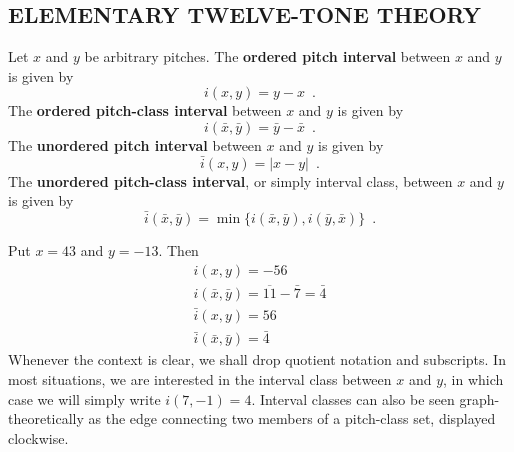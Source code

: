 
\chapter{}

\section{ELEMENTARY TWELVE-TONE THEORY}

\begin{definition}
	Let $x$ and $y$ be arbitrary pitches. The \textbf{ordered pitch interval} between
	$x$ and $y$ is given by
	\begin{equation}
		i(x, y) = y - x \enspace.
	\end{equation}
	The \textbf{ordered pitch-class interval} between $x$ and $y$ is given by
	\begin{equation}
		i(\bar{x}, \bar{y}) = \bar{y} - \bar{x} \enspace.
	\end{equation}
	The \textbf{unordered pitch interval} between $x$ and $y$ is given by
	\begin{equation}
		\bar{i}(x, y) = |x - y| \enspace.
	\end{equation}
	The \textbf{unordered pitch-class interval}, or simply interval class, between
	$x$ and $y$ is given by
	\begin{equation}
		\bar{i}(\bar{x}, \bar{y}) = \min\{i(\bar{x}, \bar{y}), i(\bar{y}, \bar{x})\} \enspace.
	\end{equation}
\end{definition}

\begin{example}
	Put $x = 43$ and $y = -13$. Then
	\begin{gather}
		i(x, y) = -56 \\
		i(\bar{x}, \bar{y}) = \overline{11} - \bar{7} = \bar{4} \\
		\bar{i}(x, y) = 56 \\
		\bar{i}(\bar{x}, \bar{y}) = \bar{4}
	\end{gather}
	Whenever the context is clear, we shall drop quotient notation and subscripts.
	In most situations, we are interested in the interval class between $x$ and $y$,
	in which case we will simply write $i(7, -1) = 4$. Interval classes can also be
	seen graph-theoretically as the edge connecting two members of a pitch-class set,
	displayed clockwise.
\end{example}

